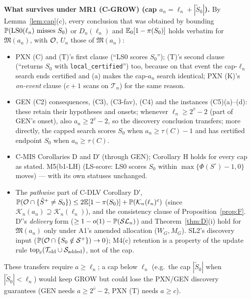 \textbf{What survives under MR1 (C-GROW) (cap $a_n=\ell_n+|\tilde{S}_0|$).} By Lemma~\ref{lem:cap}(c), every conclusion that was obtained by bounding $\mathbb P(\text{LS0}(\ell_n)\text{ misses }S_0)$ or $D_n(\ell_n)$ and $\mathbb E_0[1-\pi(S_0)]$ holds verbatim for $\mathfrak M(a_n)$, with $\mathcal O$, $U_n$ those of $\mathfrak M(a_n)$:
\begin{itemize}
\item PXN (C) and (T)'s first clause (``LS0 scores $S_0$''); (T)'s second clause (``returns $S_0$ with \texttt{local\_certified}'') too, because on that event the cap-$\ell_n$ search ends certified and (a) makes the cap-$a_n$ search identical; PXN (K)'s \emph{on-event} clause ($c+1$ scans on $\mathcal T_n$) for the same reason.
\item GEN (C2) consequences, (C3), (C3-fav), (C4) and the instances (C5)(a)--(d): these retain their hypotheses and onsets; whenever $\ell_n\ge2^{\bar{v}}-2$ (part of GEN's onset), also $a_n\ge2^{\bar{v}}-2$, so the discovery conclusion transfers; more directly, the capped search scores $S_0$ when $a_n\ge\tau(C)-1$ and has certified endpoint $S_0$ when $a_n\ge\tau(C)$.
\item C-MIS Corollaries D and D′ (through GEN); Corollary H holds for every cap as stated. M5(b1-LH) (LS-score: LS0 scores $S_0$ within $\max\{\Phi(S^\circ)-1,0\}$ moves) — with its own statuses unchanged.
\item The \emph{pathwise} part of C-DLV Corollary D′, $\mathbb P(\mathcal O\cap\{\hat S^{+}\ne S_0\})\le2\mathbb E[1-\pi(S_0)]+\mathbb P(\mathcal K_n(\ell_n)^c)$ (since $\mathcal K_n(a_n)\supseteq\mathcal K_n(\ell_n)$), and the consistency clause of Proposition~\ref{prop:F}. D′'s \emph{delivery} form ($\ge1-o(1)-\mathbb P(\mathcal{SL}_n)$) and Theorem~\ref{thm:D}(i) hold for $\mathfrak M(a_n)$ only under A1's amended allocation ($W_G,M_G$). SL2's discovery input ($\mathbb P(\mathcal O\cap\{S_0\notin\mathcal S^{+}\})\to0$); M4(c) retention is a property of the update rule $\mathrm{top}_c(\mathcal T_{\rm old}\cup\mathcal S_{\rm added})$, not of the cap.
\end{itemize}
These transfers require $a\ge\ell_n$; a cap below $\ell_n$ (e.g.\ the cap $|\tilde S_0|$ when $|\tilde S_0|<\ell_n$) would keep GROW but could lose the PXN/GEN discovery guarantees (GEN needs $a\ge2^{\bar v}-2$, PXN (T) needs $a\ge c$).

